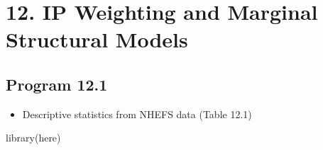 \documentclass[
  10pt,
  a4paper,
]{book}
\newenvironment{Shaded}{\begin{snugshade}}{\end{snugshade}}
\newcommand{\FunctionTok}[1]{\textcolor[rgb]{0.28,0.35,0.67}{#1}}
\newcommand{\NormalTok}[1]{\textcolor[rgb]{0.00,0.46,0.62}{#1}}
\providecommand{\tightlist}{%
  \setlength{\itemsep}{0pt}\setlength{\parskip}{0pt}}
\begin{document}
\hypertarget{ip-weighting-and-marginal-structural-models}{%
\chapter*{12. IP Weighting and Marginal Structural Models}\label{ip-weighting-and-marginal-structural-models}}

\hypertarget{program-12.1}{%
\section{Program 12.1}\label{program-12.1}}

\begin{itemize}
\tightlist
\item
  Descriptive statistics from NHEFS data (Table 12.1)
\end{itemize}

\begin{Shaded}
\begin{Highlighting}[]
\FunctionTok{library}\NormalTok{(here)}
\end{Highlighting}
\end{Shaded}
\end{document}
